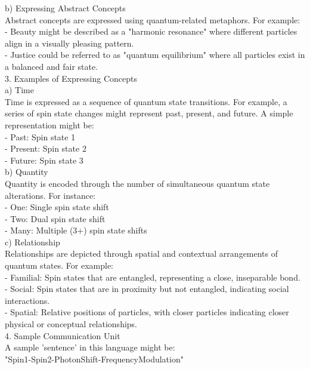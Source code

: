 \begin{tcolorbox}[breakable,boxrule=0.5pt,sharp corners,fontupper=\small,
colback=green!10, colframe=green!50!black, title={Success: A Xenolinguistic Conlang for Resonants}]
b) Expressing Abstract Concepts\\
Abstract concepts are expressed using quantum-related metaphors. For example:\\
- Beauty might be described as a "harmonic resonance" where different particles align in a visually pleasing pattern.\\
- Justice could be referred to as "quantum equilibrium" where all particles exist in a balanced and fair state.\\

3. Examples of Expressing Concepts\\

a) Time\\
Time is expressed as a sequence of quantum state transitions. For example, a series of spin state changes might represent past, present, and future. A simple representation might be:\\
- Past: Spin state 1\\
- Present: Spin state 2\\
- Future: Spin state 3\\

b) Quantity\\
Quantity is encoded through the number of simultaneous quantum state alterations. For instance:\\
- One: Single spin state shift\\
- Two: Dual spin state shift\\
- Many: Multiple (3+) spin state shifts\\

c) Relationship\\
Relationships are depicted through spatial and contextual arrangements of quantum states. For example:\\
- Familial: Spin states that are entangled, representing a close, inseparable bond.\\
- Social: Spin states that are in proximity but not entangled, indicating social interactions.\\
- Spatial: Relative positions of particles, with closer particles indicating closer physical or conceptual relationships.\\

4. Sample Communication Unit\\

A sample 'sentence' in this language might be:\\
"Spin1-Spin2-PhotonShift-FrequencyModulation"\\


\end{tcolorbox}
